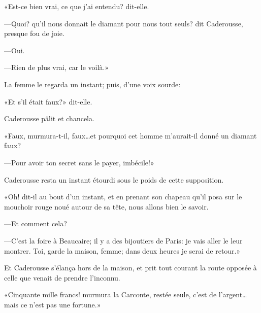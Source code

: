 «Est-ce bien vrai, ce que j'ai entendu? dit-elle.

—Quoi? qu'il nous donnait le diamant pour nous tout seuls? dit Caderousse, presque fou de joie.

—Oui.

—Rien de plus vrai, car le voilà.»

La femme le regarda un instant; puis, d'une voix sourde:

«Et s'il était faux?» dit-elle.

Caderousse pâlit et chancela.

«Faux, murmura-t-il, faux\dots et pourquoi cet homme m'aurait-il donné un diamant faux?

—Pour avoir ton secret sans le payer, imbécile!»

Caderousse resta un instant étourdi sous le poids de cette supposition.

«Oh! dit-il au bout d'un instant, et en prenant son chapeau qu'il posa sur le mouchoir rouge noué autour de sa tête, nous allons bien le savoir.

—Et comment cela?

—C'est la foire à Beaucaire; il y a des bijoutiers de Paris: je vais aller le leur montrer. Toi, garde la maison, femme; dans deux heures je serai de retour.»

Et Caderousse s'élança hors de la maison, et prit tout courant la route opposée à celle que venait de prendre l'inconnu.

«Cinquante mille francs! murmura la Carconte, restée seule, c'est de l'argent\dots mais ce n'est pas une fortune.»



